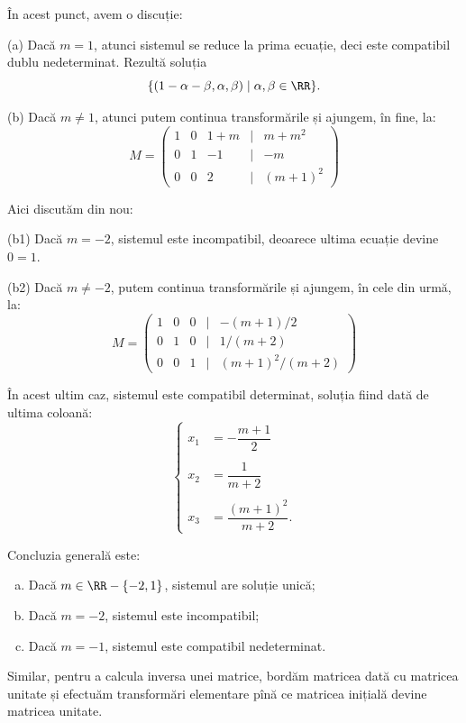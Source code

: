 În acest punct, avem o discuție:

(a) Dacă $m = 1$, atunci sistemul se reduce la prima ecuație, deci este compatibil
dublu nedeterminat. Rezultă soluția
\[
    \{ (1 - \alpha - \beta, \alpha, \beta) \mid \alpha, \beta \in \RR \}.
\]

(b) Dacă $m \neq 1$, atunci putem continua transformările și ajungem, în fine, la:
\[
    M = \begin{pmatrix}
        1 & 0 & 1 + m & \mid & m + m^2 \\
        0 & 1 & -1 & \mid & -m \\
        0 & 0 & 2 & \mid & (m + 1)^2
    \end{pmatrix}
\]

Aici discutăm din nou:

(b1) Dacă $m = -2$, sistemul este incompatibil, deoarece ultima ecuație devine $0 = 1$.

(b2) Dacă $m \neq -2$, putem continua transformările și ajungem, în cele din urmă, la:
\[
    M = %
    \begin{pmatrix}
        1 & 0 & 0 & \mid & -(m+1)/2 \\
        0 & 1 & 0 & \mid & 1/(m+2) \\
        0 & 0 & 1 & \mid & (m+1)^2/(m+2)
    \end{pmatrix}
\]


În acest ultim caz, sistemul este compatibil determinat, soluția fiind dată de ultima coloană:
\[
    \begin{cases}
        x_1  &= -\dfrac{m + 1}{2} \\
    & \\
        x_2  &= \dfrac{1}{m + 2} \\
    & \\
        x_3  &= \dfrac{(m + 1)^2}{m + 2}.
    \end{cases}
\]

Concluzia generală este:
\begin{enumerate}[(a)]
    \item Dacă $m \in \RR - \{-2, 1\}$, sistemul are soluție unică;
    \item Dacă $m = -2$, sistemul este incompatibil;
    \item Dacă $m = -1$, sistemul este compatibil nedeterminat.
\end{enumerate}

\vspace{1cm}

Similar, pentru a calcula inversa unei matrice, bordăm matricea dată cu matricea
unitate și efectuăm transformări elementare pînă ce matricea inițială devine
matricea unitate.

